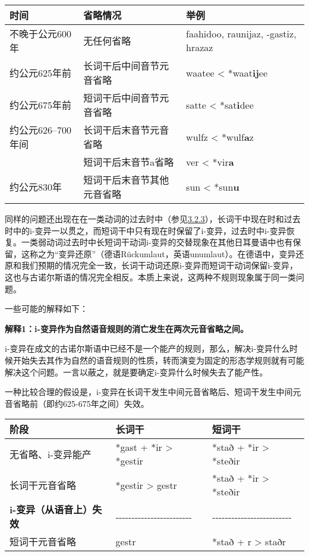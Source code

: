 \begin{longtable}{lll}
\toprule
时间 & 省略情况 & 举例 \\
\midrule
\endhead
\bottomrule
\endfoot
不晚于公元600年 & 无任何省略 & faahidoo, raunijaz, -gastiz, hrazaz \\
约公元625年前 & 长词干后中间音节元音省略 & waatee \textless{}
*waat\textbf{ij}ee \\
约公元675年前 & 短词干后中间音节元音省略 & satte \textless{}
*sat\textbf{i}dee \\
约公元626--700年间 & 长词干后末音节元音省略 & wulfz \textless{}
*wulf\textbf{a}z \\
& 短词干后末音节a省略 & ver \textless{} *vir\textbf{a} \\
约公元830年 & 短词干后末音节其他元音省略 & sun \textless{}
*sun\textbf{u} \\
\end{longtable}

同样的问题还出现在在一类动词的过去时中（参见\hyperref[ux7b2cux4e00ux5f3aux53d8ux4f4dux6cd5]{3.2.3}），长词干中现在时和过去时中的i-变异一以贯之，而短词干中只有现在时保留了i-变异，过去时中i-变异恢复。一类弱动词过去时中长短词干动词i-变异的交替现象在其他日耳曼语中也有保留，这称之为``变异还原''（德语Rückumlaut，英语unumlaut）。在德语中，变异还原和我们预期的情况完全一致，长词干动词还原i-变异而短词干动词保留i-变异，这也与古诺尔斯语的情况完全相反。本质上来说，这两种不规则现象属于同一类问题。

一些可能的解释如下：

\textbf{解释1：i-变异作为自然语音规则的消亡发生在两次元音省略之间。}

i-变异在成文的古诺尔斯语中已经不是一个能产的规则，那么，解决i-变异什么时候开始失去其作为自然的语音规则的性质，转而演变为固定的形态学规则就有可能解决这个问题。一言以蔽之，就是要确定i-变异什么时候失去了能产性。

一种比较合理的假设是，i-变异在长词干发生中间元音省略后、短词干发生中间元音省略前（即约625-675年之间）失效。

\begin{longtable}{lll}
\toprule
阶段 & 长词干 & 短词干 \\
\midrule
\endhead
\bottomrule
\endfoot
无省略、i-变异能产 & *gast + *ir \textgreater{} *gestir & *stað + *ir
\textgreater{} *steðir \\
长词干元音省略 & *gestir \textgreater{} gestr & *stað + *ir
\textgreater{} *steðir \\
\textbf{i-变异（从语音上）失效} & ‑‑‑‑‑‑‑‑‑‑‑‑‑‑‑‑‑‑‑‑‑‑‑‑ &
‑‑‑‑‑‑‑‑‑‑‑‑‑‑‑‑‑‑‑‑‑‑‑‑‑ \\
短词干元音省略 & gestr & *stað + r \textgreater{} staðr \\
\end{longtable}

